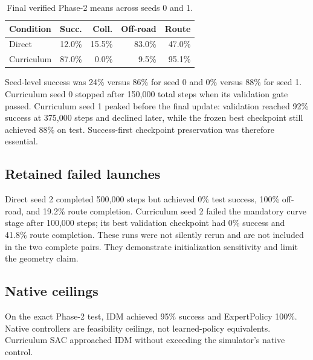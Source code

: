 \documentclass[10pt,twocolumn]{article}
\begin{document}
\begin{table}[t]
\centering
\caption{Final verified Phase-2 means across seeds 0 and 1.}
\begin{tabular}{lrrrr}
\toprule
Condition & Succ. & Coll. & Off-road & Route \\
\midrule
Direct & 12.0\% & 15.5\% & 83.0\% & 47.0\% \\
Curriculum & 87.0\% & 0.0\% & 9.5\% & 95.1\% \\
\bottomrule
\end{tabular}
\end{table}

Seed-level success was 24\% versus 86\% for seed 0 and 0\% versus 88\% for seed 1.
Curriculum seed 0 stopped after 150,000 total steps when its validation gate passed.
Curriculum seed 1 peaked before the final update: validation reached 92\% success at
375,000 steps and declined later, while the frozen best checkpoint still achieved 88\%
on test. Success-first checkpoint preservation was therefore essential.

\subsection{Retained failed launches}
Direct seed 2 completed 500,000 steps but achieved 0\% test success, 100\% off-road, and
19.2\% route completion. Curriculum seed 2 failed the mandatory curve stage after
100,000 steps; its best validation checkpoint had 0\% success and 41.8\% route
completion. These runs were not silently rerun and are not included in the two complete
pairs. They demonstrate initialization sensitivity and limit the geometry claim.

\subsection{Native ceilings}
On the exact Phase-2 test, IDM achieved 95\% success and ExpertPolicy 100\%. Native
controllers are feasibility ceilings, not learned-policy equivalents. Curriculum SAC
approached IDM without exceeding the simulator's native control.
\end{document}
